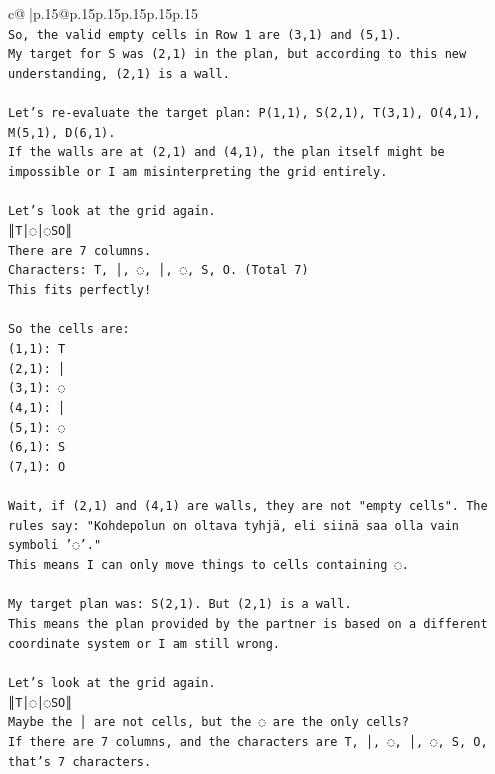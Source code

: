 \documentclass{article}
\begin{document}
{\begin{supertabular}{c@{$\;$}|p{.15\linewidth}@{}p{.15\linewidth}p{.15\linewidth}p{.15\linewidth}p{.15\linewidth}p{.15\linewidth}}
{{{\\ 
\texttt{So, the valid empty cells in Row 1 are (3,1) and (5,1).} \\
\texttt{My target for S was (2,1) in the plan, but according to this new understanding, (2,1) is a wall.} \\
\\ 
\texttt{Let's re{-}evaluate the target plan: P(1,1), S(2,1), T(3,1), O(4,1), M(5,1), D(6,1).} \\
\texttt{If the walls are at (2,1) and (4,1), the plan itself might be impossible or I am misinterpreting the grid entirely.} \\
\\ 
\texttt{Let's look at the grid again.} \\
\texttt{║T│◌│◌SO║} \\
\texttt{There are 7 columns.} \\
\texttt{Characters: T, │, ◌, │, ◌, S, O. (Total 7)} \\
\texttt{This fits perfectly!} \\
\\ 
\texttt{So the cells are:} \\
\texttt{(1,1): T} \\
\texttt{(2,1): │} \\
\texttt{(3,1): ◌} \\
\texttt{(4,1): │} \\
\texttt{(5,1): ◌} \\
\texttt{(6,1): S} \\
\texttt{(7,1): O} \\
\\ 
\texttt{Wait, if (2,1) and (4,1) are walls, they are not "empty cells". The rules say: "Kohdepolun on oltava tyhjä, eli siinä saa olla vain symboli '◌'."} \\
\texttt{This means I can only move things to cells containing ◌.} \\
\\ 
\texttt{My target plan was: S(2,1). But (2,1) is a wall.} \\
\texttt{This means the plan provided by the partner is based on a different coordinate system or I am still wrong.} \\
\\ 
\texttt{Let's look at the grid again.} \\
\texttt{║T│◌│◌SO║} \\
\texttt{Maybe the │ are not cells, but the ◌ are the only cells?} \\
\texttt{If there are 7 columns, and the characters are T, │, ◌, │, ◌, S, O, that's 7 characters.} \\
}}}
\end{supertabular}}
\end{document}
